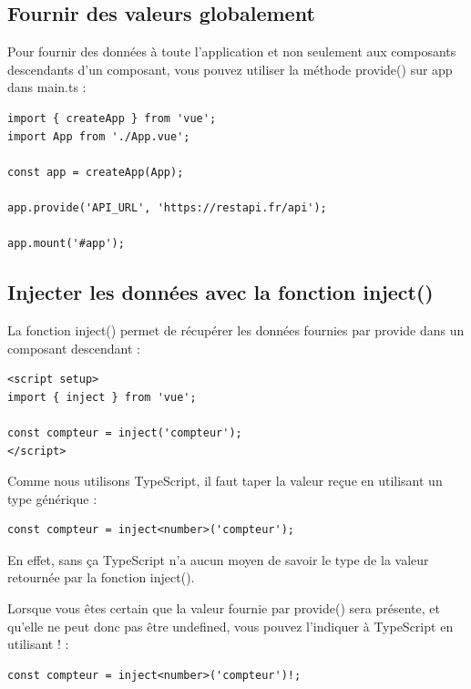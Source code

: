 \documentclass{article}
\begin{document}
\subsection{Fournir des valeurs globalement}
Pour fournir des données à toute l'application et non seulement aux composants descendants d'un composant, vous pouvez utiliser la méthode provide() sur app dans main.ts :
\begin{verbatim}
import { createApp } from 'vue';
import App from './App.vue';

const app = createApp(App);

app.provide('API_URL', 'https://restapi.fr/api');

app.mount('#app');
\end{verbatim}
\subsection{Injecter les données avec la fonction {\color{monOrange}inject()}}
La fonction {\color{monOrange}inject()} permet de récupérer les données fournies par {\color{monOrange}provide} dans un composant descendant :
\begin{verbatim}
<script setup>
import { inject } from 'vue';

const compteur = inject('compteur');
</script>
\end{verbatim}
Comme nous utilisons {\color{monOrange}TypeScript}, il faut taper la valeur reçue en utilisant un type générique :
\begin{verbatim}
const compteur = inject<number>('compteur');
\end{verbatim}
En effet, sans ça {\color{monOrange}TypeScript} n'a aucun moyen de savoir le type de la valeur retournée par la fonction {\color{monOrange}inject()}.

Lorsque vous êtes certain que la valeur fournie par {\color{monOrange}provide()} sera présente, et qu'elle ne peut donc pas être undefined, vous pouvez l'indiquer à {\color{monOrange}TypeScript} en utilisant ! :
\begin{verbatim}
const compteur = inject<number>('compteur')!;
\end{verbatim}
\end{document}
